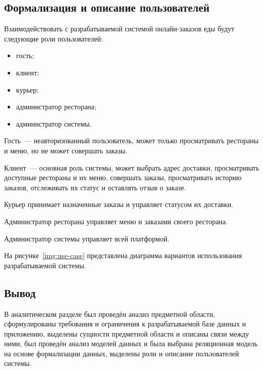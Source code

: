 \subsection{Формализация и описание пользователей}
Взаимодействовать с разрабатываемой системой онлайн-заказов еды будут следующие роли пользователей:
\begin{itemize}
    \item гость;
    \item клиент;
    \item курьер;
    \item администратор ресторана;
    \item администратор системы.
\end{itemize}

Гость~--- неавторизованный пользователь, может только просматривать рестораны и меню, но не может совершать заказы.

Клиент~--- основная роль системы, может выбрать адрес доставки, просматривать доступные рестораны и их меню, совершать заказы, просматривать историю заказов, отслеживать их статус и оставлять отзыв о заказе.

Курьер принимает назначенные заказы и управляет статусом их доставки.

Администратор ресторана управляет меню и заказами своего ресторана.

Администратор системы управляет всей платформой.

На рисунке~\ref{img:use-case} представлена диаграмма вариантов использования разрабатываемой системы.

\subsection{Вывод}
В аналитическом разделе был проведён анализ предметной области, сформулированы требования и ограничения к разрабатываемой базе данных и приложению, выделены сущности предметной области и описаны связи между ними, был проведён анализ моделей данных и была выбрана реляционная модель на основе формализации данных, выделены роли и описание пользователей системы.